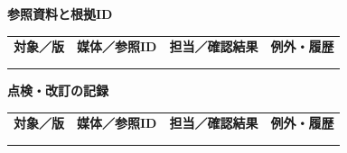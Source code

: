\documentclass[11pt,a4paper]{article}
\begin{document}
\par{}\noindent\textbf{参照資料と根拠ID}\par\vspace{1mm}
{\fontsize{8.5}{13}\selectfont
\begin{tabularx}{\linewidth}{@{}XXXX@{}}
\textbf{対象／版} & \textbf{媒体／参照ID} & \textbf{担当／確認結果} & \textbf{例外・履歴}\\[2mm]
\strut & \strut & \strut & \strut\\[5mm]
\strut & \strut & \strut & \strut\\[5mm]
\end{tabularx}
}\vspace{2mm}\par
{}
\par{}\noindent\textbf{点検・改訂の記録}\par\vspace{1mm}
{\fontsize{8.5}{13}\selectfont
\begin{tabularx}{\linewidth}{@{}XXXX@{}}
\textbf{対象／版} & \textbf{媒体／参照ID} & \textbf{担当／確認結果} & \textbf{例外・履歴}\\[2mm]
\strut & \strut & \strut & \strut\\[5mm]
\strut & \strut & \strut & \strut\\[5mm]
\end{tabularx}
}\vspace{2mm}\par
\end{document}

